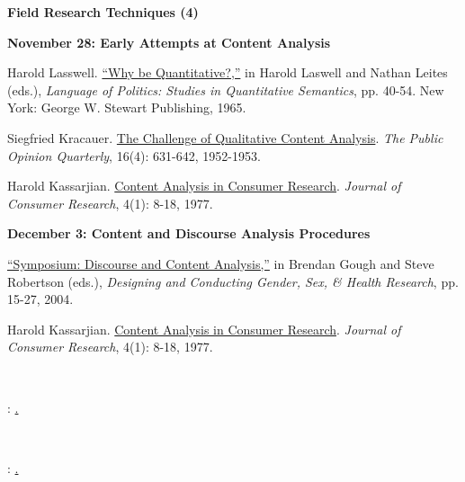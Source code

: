 \documentclass[letterpaper]{article}
\renewenvironment{itemize}{
  \begin{list}{}{
    \setlength{\leftmargin}{1.5em}
  }
}{
  \end{list}
}
\begin{document}
\begin{enumerate}
\item {\bf Field Research Techniques (4)}
		
		\begin{itemize}
		\item {\bf November 28: Early Attempts at Content Analysis}
			\begin{itemize}
				\item[$\bullet$] Harold Lasswell. \href{https://us.corwin.com/sites/default/files/upm-binaries/19018_Franzosi_V1_Ch01.pdf}{``Why be Quantitative?,''} in Harold Laswell and Nathan Leites (eds.), \emph{Language of Politics: Studies in Quantitative Semantics}, pp. 40-54. New York: George W. Stewart Publishing, 1965.
				\item[$\bullet$] Siegfried Kracauer. \href{http://www.jstor.org/stable/2746123}{The Challenge of Qualitative Content Analysis}. \emph{The Public Opinion Quarterly}, 16(4): 631-642, 1952-1953. 
				\item[$\bullet$] Harold Kassarjian. \href{http://www.jstor.org/stable/2488631}{Content Analysis in Consumer Research}. \emph{Journal of Consumer Research}, 4(1): 8-18, 1977.
			\end{itemize}
		\end{itemize}

		
		\begin{itemize}
		\item {\bf December 3: Content and Discourse Analysis Procedures}
			\begin{itemize}
				\item[$\bullet$] \href{https://wcfia.harvard.edu/files/wcfia/files/870_symposium.pdf}{``Symposium: Discourse and Content Analysis,''} in Brendan Gough and Steve Robertson (eds.), \emph{Designing and Conducting Gender, Sex, \& Health Research}, pp. 15-27, 2004.
				\item[$\bullet$] Harold Kassarjian. \href{http://www.jstor.org/stable/2488631}{Content Analysis in Consumer Research}. \emph{Journal of Consumer Research}, 4(1): 8-18, 1977.
			\end{itemize}
		\end{itemize}

~\\
\item[] \begin{center}{\color{blue}{\bf Final Presentations/``Conference''}: \underline{{\unskip}.}}\end{center}
~\\


\item[] \begin{center}{\color{blue}{\bf Final Exam}: \underline{{\unskip}.}}\end{center}
~\\

\end{enumerate}
\end{document}

